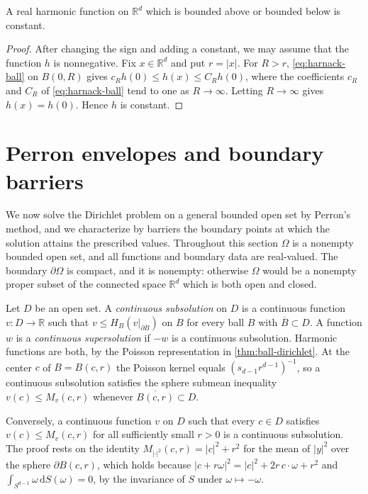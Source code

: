 \begin{corollary}\label{cor:harmonic-liouville}
A real harmonic function on $\mathbb R^d$ which is bounded above or bounded below is constant.
\end{corollary}
\begin{proof}
After changing the sign and adding a constant, we may assume that the function $h$ is nonnegative. Fix $x\in\mathbb R^d$ and put $r=|x|$. For $R>r$, \eqref{eq:harnack-ball} on $B(0,R)$ gives $c_Rh(0)\leq h(x)\leq C_Rh(0)$, where the coefficients $c_R$ and $C_R$ of \eqref{eq:harnack-ball} tend to one as $R\to\infty$. Letting $R\to\infty$ gives $h(x)=h(0)$. Hence $h$ is constant.
\end{proof}

\section{Perron envelopes and boundary barriers}
\label{sec:perron-barriers}
We now solve the Dirichlet problem on a general bounded open set by Perron's method, and we characterize by barriers the boundary points at which the solution attains the prescribed values. Throughout this section $\Omega$ is a nonempty bounded open set, and all functions and boundary data are real-valued. The boundary $\partial\Omega$ is compact, and it is nonempty: otherwise $\Omega$ would be a nonempty proper subset of the connected space $\mathbb R^d$ which is both open and closed.

Let $D$ be an open set. A \emph{continuous subsolution} on $D$ is a continuous function $v\colon D\to\mathbb R$ such that $v\leq H_B(v|_{\partial B})$ on $B$ for every ball $B$ with $\overline B\subset D$. A function $w$ is a \emph{continuous supersolution} if $-w$ is a continuous subsolution. Harmonic functions are both, by the Poisson representation in \cref{thm:ball-dirichlet}. At the center $c$ of $B=B(c,r)$ the Poisson kernel equals $(s_{d-1}r^{d-1})^{-1}$, so a continuous subsolution satisfies the sphere submean inequality $v(c)\leq M_v(c,r)$ whenever $\overline{B(c,r)}\subset D$.

Conversely, a continuous function $v$ on $D$ such that every $c\in D$ satisfies $v(c)\leq M_v(c,r)$ for all sufficiently small $r>0$ is a continuous subsolution. The proof rests on the identity $M_{|\cdot|^2}(c,r)=|c|^2+r^2$ for the mean of $|y|^2$ over the sphere $\partial B(c,r)$, which holds because $|c+r\omega|^2=|c|^2+2r\,c\cdot\omega+r^2$ and $\int_{S^{d-1}}\omega\,\mathrm dS(\omega)=0$, by the invariance of $S$ under $\omega\mapsto-\omega$.

